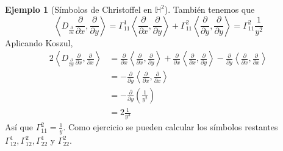 \documentclass[spanish]{book}
\theoremstyle{definition}
\newtheorem*{ejem}{Ejemplo}
\newcommand{\Hy}{\mathbb{H}}
\begin{document}
\begin{ejem}[Símbolos de Christoffel en $\Hy^2$]
		También tenemos que
		\[\left\langle D_{\frac{\partial}{\partial x}}\frac{\partial}{\partial x},\frac{\partial}{\partial y}\right\rangle=\Gamma_{11}^1\left\langle \frac{\partial}{\partial x},\frac{\partial}{\partial y}\right\rangle+\Gamma_{11}^2\left\langle \frac{\partial}{\partial y},\frac{\partial}{\partial y}\right\rangle=\Gamma_{11}^2\frac{1}{y^2}\]
		Aplicando Koszul,
		\begin{align*}
			2\left\langle D_{\frac{\partial}{\partial x}}\frac{\partial}{\partial x},\frac{\partial}{\partial x}\right\rangle&=\frac{\partial}{\partial x}\left\langle \frac{\partial}{\partial x},\frac{\partial}{\partial y}\right\rangle+\frac{\partial}{\partial x}\left\langle \frac{\partial}{\partial x},\frac{\partial}{\partial y}\right\rangle-\frac{\partial}{\partial y}\left\langle \frac{\partial}{\partial x},\frac{\partial}{\partial x}\right\rangle\\
			&=-\frac{\partial}{\partial y}\left\langle \frac{\partial}{\partial x},\frac{\partial}{\partial x}\right\rangle\\
			&=-\frac{\partial}{\partial y}\left(\frac{1}{y^2}\right)\\
			&=2\frac{1}{y^3}
		\end{align*}
		Así que $\Gamma_{11}^2=\frac{1}{y}$.
		Como ejercicio se pueden calcular los símbolos restantes $\Gamma^1_{12},\Gamma^2_{12},\Gamma^1_{22}$ y $\Gamma^2_{22}$.
	\end{ejem}
	
\end{document}
